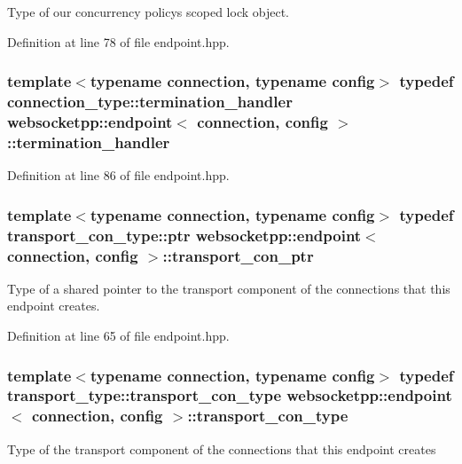 Type of our concurrency policy\textquotesingle{}s scoped lock object. 



Definition at line 78 of file endpoint.\+hpp.

\hypertarget{classwebsocketpp_1_1endpoint_a24710dbab3b51673b5459b7b609d5d66}{}
\subsubsection[{termination\+\_\+handler}]{\setlength{\rightskip}{0pt plus 5cm}template$<$typename connection, typename config$>$ typedef {\bf connection\+\_\+type\+::termination\+\_\+handler} {\bf websocketpp\+::endpoint}$<$ {\bf connection}, config $>$\+::{\bf termination\+\_\+handler}}\label{classwebsocketpp_1_1endpoint_a24710dbab3b51673b5459b7b609d5d66}


Definition at line 86 of file endpoint.\+hpp.

\hypertarget{classwebsocketpp_1_1endpoint_a22be3833280c548d724298eba0f00b2a}{}
\subsubsection[{transport\+\_\+con\+\_\+ptr}]{\setlength{\rightskip}{0pt plus 5cm}template$<$typename connection, typename config$>$ typedef transport\+\_\+con\+\_\+type\+::ptr {\bf websocketpp\+::endpoint}$<$ {\bf connection}, config $>$\+::{\bf transport\+\_\+con\+\_\+ptr}}\label{classwebsocketpp_1_1endpoint_a22be3833280c548d724298eba0f00b2a}
Type of a shared pointer to the transport component of the connections that this endpoint creates. 

Definition at line 65 of file endpoint.\+hpp.

\hypertarget{classwebsocketpp_1_1endpoint_aaec9d745cafcee505c63efff421e3dff}{}
\subsubsection[{transport\+\_\+con\+\_\+type}]{\setlength{\rightskip}{0pt plus 5cm}template$<$typename connection, typename config$>$ typedef transport\+\_\+type\+::transport\+\_\+con\+\_\+type {\bf websocketpp\+::endpoint}$<$ {\bf connection}, config $>$\+::{\bf transport\+\_\+con\+\_\+type}}\label{classwebsocketpp_1_1endpoint_aaec9d745cafcee505c63efff421e3dff}
Type of the transport component of the connections that this endpoint creates 

